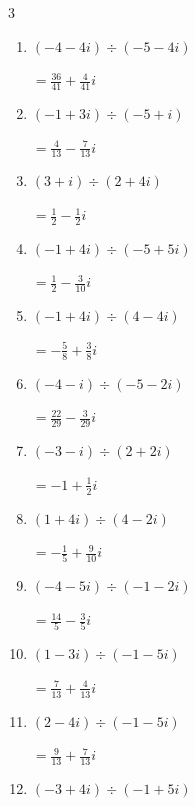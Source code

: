 \begin{multicols}{3}
\begin{enumerate}
\columnbreak %

\resetques

  \item $\displaystyle (-4-4i)\div(-5-4i)$

        $\displaystyle =\frac{36}{41}+\frac{4}{41}i$

  \item $\displaystyle (-1+3i)\div(-5+i)$

        $\displaystyle =\frac{4}{13}-\frac{7}{13}i$

  \item $\displaystyle (3+i)\div(2+4i)$

        $\displaystyle =\frac{1}{2}-\frac{1}{2}i$

  \item $\displaystyle (-1+4i)\div(-5+5i)$

        $\displaystyle =\frac{1}{2}-\frac{3}{10}i$

  \item $\displaystyle (-1+4i)\div(4-4i)$

        $\displaystyle =-\frac{5}{8}+\frac{3}{8}i$

  \item $\displaystyle (-4-i)\div(-5-2i)$

        $\displaystyle =\frac{22}{29}-\frac{3}{29}i$

  \item $\displaystyle (-3-i)\div(2+2i)$

        $\displaystyle =-1+\frac{1}{2}i$

  \item $\displaystyle (1+4i)\div(4-2i)$

        $\displaystyle =-\frac{1}{5}+\frac{9}{10}i$

  \item $\displaystyle (-4-5i)\div(-1-2i)$

        $\displaystyle =\frac{14}{5}-\frac{3}{5}i$

  \item $\displaystyle (1-3i)\div(-1-5i)$

        $\displaystyle =\frac{7}{13}+\frac{4}{13}i$

\columnbreak %

  \item $\displaystyle (2-4i)\div(-1-5i)$

        $\displaystyle =\frac{9}{13}+\frac{7}{13}i$

  \item $\displaystyle (-3+4i)\div(-1+5i)$


\end{enumerate}
\end{multicols}
